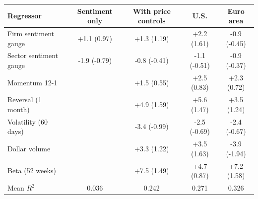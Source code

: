 \begin{tabular}{lcccc}
\toprule
Regressor & Sentiment only & With price controls & U.S. & Euro area \\
\midrule
Firm sentiment gauge & +1.1 (0.97) & +1.3 (1.19) & +2.2 (1.61) & -0.9 (-0.45) \\
Sector sentiment gauge & -1.9 (-0.79) & -0.8 (-0.41) & -1.1 (-0.51) & -0.9 (-0.37) \\
Momentum 12-1 &  & +1.5 (0.55) & +2.5 (0.83) & +2.3 (0.72) \\
Reversal (1 month) &  & +4.9 (1.59) & +5.6 (1.47) & +3.5 (1.24) \\
Volatility (60 days) &  & -3.4 (-0.99) & -2.5 (-0.69) & -2.4 (-0.67) \\
Dollar volume &  & +3.3 (1.22) & +3.5 (1.63) & -3.9 (-1.94) \\
Beta (52 weeks) &  & +7.5 (1.49) & +4.7 (0.87) & +7.2 (1.58) \\
Mean $R^2$ & 0.036 & 0.242 & 0.271 & 0.326 \\
\bottomrule
\end{tabular}

